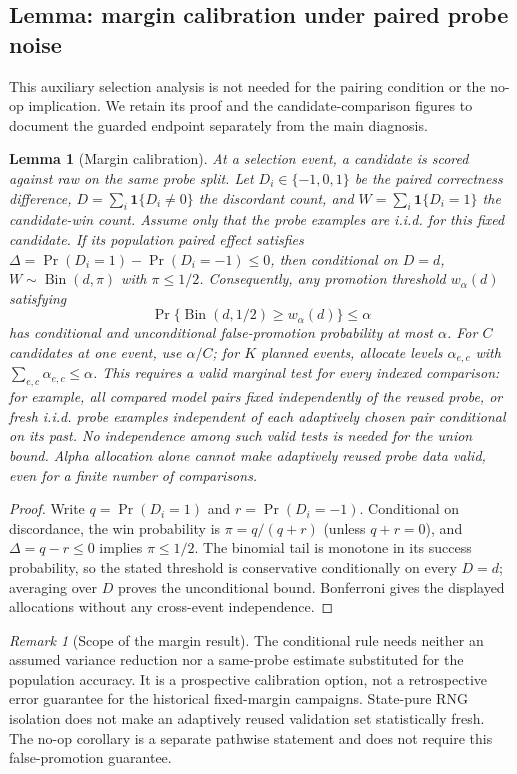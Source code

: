 \documentclass[10pt,letterpaper]{article}
\newtheorem{lemma}{Lemma}
\theoremstyle{remark}
\newtheorem*{remarkx}{Remark}
\begin{document}
\subsection{Lemma: margin calibration under paired probe noise}

This auxiliary selection analysis is not needed for the pairing condition
or the no-op implication. We retain its proof and the candidate-comparison
figures to document the guarded endpoint separately from the main diagnosis.

\begin{lemma}[Margin calibration]
\label{lem:margin}
At a selection event, a candidate is scored against raw on the same probe
split. Let $D_i\in\{-1,0,1\}$ be the paired correctness difference,
$D=\sum_i\mathbf 1\{D_i\ne0\}$ the discordant count, and
$W=\sum_i\mathbf 1\{D_i=1\}$ the candidate-win count. Assume only that the
probe examples are i.i.d. for this fixed candidate. If its population paired
effect satisfies $\Delta=\Pr(D_i=1)-\Pr(D_i=-1)\le0$, then conditional on
$D=d$, $W\sim\operatorname{Bin}(d,\pi)$ with $\pi\le1/2$. Consequently, any
promotion threshold $w_\alpha(d)$ satisfying
\[
\Pr\{\operatorname{Bin}(d,1/2)\ge w_\alpha(d)\}\le\alpha
\]
has conditional and unconditional false-promotion probability at most
$\alpha$. For $C$ candidates at one event, use $\alpha/C$; for $K$ planned
events, allocate levels $\alpha_{e,c}$ with $\sum_{e,c}\alpha_{e,c}\le\alpha$.
This requires a valid marginal test for every indexed comparison: for
example, all compared model pairs fixed independently of the reused probe,
or fresh i.i.d. probe examples independent of each adaptively chosen pair
conditional on its past. No independence among such valid tests is needed
for the union bound. Alpha allocation alone cannot make adaptively reused
probe data valid, even for a finite number of comparisons.
\end{lemma}

\begin{proof}
Write $q=\Pr(D_i=1)$ and $r=\Pr(D_i=-1)$. Conditional on discordance,
the win probability is $\pi=q/(q+r)$ (unless $q+r=0$), and
$\Delta=q-r\le0$ implies $\pi\le1/2$. The binomial tail is monotone in its
success probability, so the stated threshold is conservative conditionally
on every $D=d$; averaging over $D$ proves the unconditional bound. Bonferroni
gives the displayed allocations without any cross-event independence.
\end{proof}
\begin{remarkx}[Scope of the margin result]
The conditional rule needs neither an assumed variance reduction nor a
same-probe estimate substituted for the population accuracy. It is a prospective calibration
option, not a retrospective error guarantee for the historical fixed-margin
campaigns. State-pure RNG isolation does not make an adaptively reused
validation set statistically fresh. The no-op corollary is a separate
pathwise statement and does not require this false-promotion guarantee.
\end{remarkx}
\end{document}

